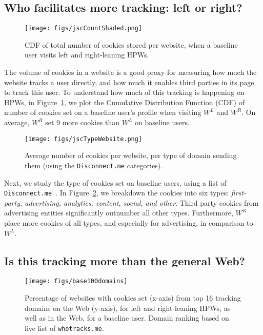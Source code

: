 \documentclass{article}
\newcommand{\hpws}{HPWs\xspace}
\begin{document}
\subsection{Who facilitates more tracking: left or right?}\label{sec:left-vs-right-baselines}

\begin{figure}
    \centering
    \texttt{[image: figs/jscCountShaded.png]}
    \caption{CDF of total number of cookies stored per website, when a baseline user visits left and right-leaning \hpws.}%
    \label{fig:jsCookiesCDF}
\end{figure}


The volume of cookies in a website is a good proxy for measuring how much the website tracks a user directly, and how much it enables third parties in its page to track this user.
To understand how much of this tracking is happening on \hpws, in Figure~\ref{fig:jsCookiesCDF}, we plot the Cumulative Distribution Function (CDF) of number of cookies set on a baseline user's profile when visiting $W^L$ and $W^R$.
On average, $W^R$ set 9 more cookies than $W^L$ on baseline users.


\begin{figure}[t]
    \centering
    \texttt{[image: figs/jscTypeWebsite.png]}
    \caption{Average number of cookies per website, per type of domain sending them (using the \texttt{Disconnect.me} categories).}
    \label{fig:jscType}
\end{figure}

Next, we study the type of cookies set on baseline users, using a list of \texttt{Disconnect.me}~\cite{disconnectme}.
In Figure~\ref{fig:jscType}, we breakdown the cookies into six types: \emph{first-party, advertising, analytics, content, social, and other}.
Third party cookies from advertising entities significantly outnumber all other types.
Furthermore, $W^R$ place more cookies of all types, and especially for advertising, in comparison to $W^L$.



\subsection{Is this tracking more than the general Web?}\label{sec:top-trackers-baselines}
\begin{figure}
    \centering
    \texttt{[image: figs/base100domains]}
    \caption{Percentage of websites with cookies set (x-axis) from top 16 tracking domains on the Web (y-axis), for left and right-leaning \hpws, as well as in the Web, for a baseline user.
        Domain ranking based on live list of \texttt{whotracks.me}.}
    \label{fig:toptrackers-baseline}
\end{figure}
\end{document}
